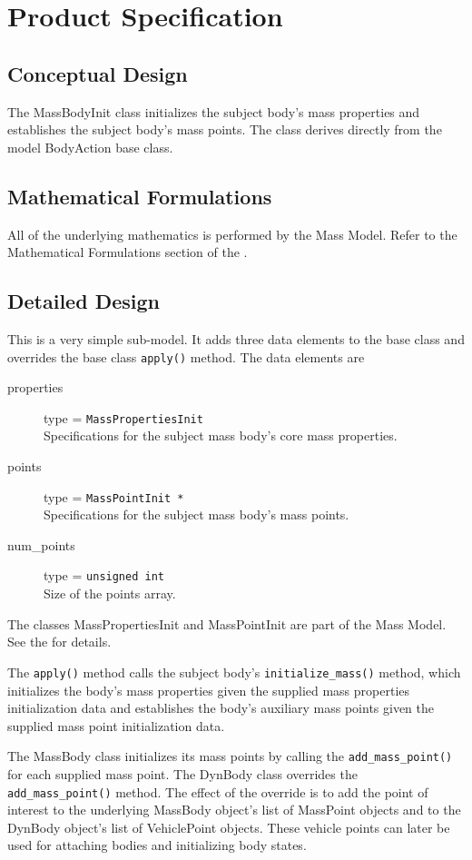 %

\chapter{Product Specification}\label{ch:\modelpartid:spec}

\section{Conceptual Design}
The MassBodyInit class initializes the subject body's mass
properties and establishes the subject body's mass points.
The class derives directly from the model BodyAction base class.

\section{Mathematical Formulations}
All of the underlying mathematics is performed by the Mass Model.
Refer to the Mathematical Formulations section of
the .

\section{Detailed Design}
This is a very simple sub-model. It adds three data elements to
the base class and overrides the base class {\tt apply()} method.
The data elements are
\begin{description}
\item[properties] type = {\tt MassPropertiesInit} \\
      Specifications for the subject mass body's core mass properties.
\item[points] type = {\tt MassPointInit *} \\
      Specifications for the subject mass body's mass points.
\item[num\_points] type = {\tt unsigned int} \\
      Size of the points array.
\end{description}

The classes MassPropertiesInit and MassPointInit
are part of the Mass Model.
See the  for details.

The {\tt apply()} method calls the subject body's {\tt initialize\_mass()}
method, which initializes the body's mass properties given the supplied mass
properties initialization data and establishes the body's auxiliary mass points
given the supplied mass point initialization data.

The MassBody class initializes its mass points by calling the
{\tt add\_mass\_point()} for each supplied mass point.
The DynBody class overrides the {\tt add\_mass\_point()} method.
The effect of the override is to add the point of interest
to the underlying MassBody object's list of MassPoint objects and
to the DynBody object's list of VehiclePoint objects. These vehicle
points can later be used for attaching bodies and initializing body states.
